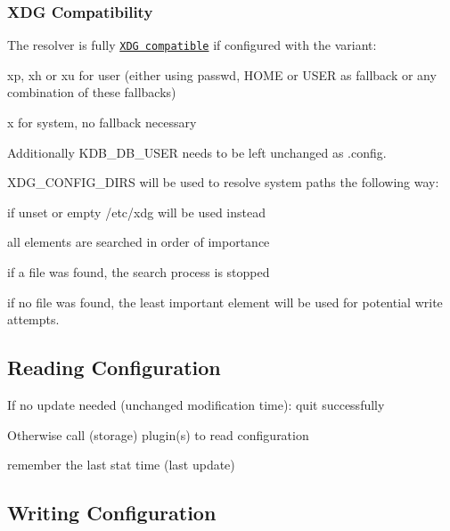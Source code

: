 \subsubsection*{X\+D\+G Compatibility}

The resolver is fully \href{http://standards.freedesktop.org/basedir-spec/basedir-spec-latest.html}{\tt X\+D\+G compatible} if configured with the variant\+:


\begin{DoxyItemize}
\item xp, xh or xu for user (either using passwd, H\+O\+M\+E or U\+S\+E\+R as fallback or any combination of these fallbacks)
\item x for system, no fallback necessary
\end{DoxyItemize}

Additionally {\ttfamily K\+D\+B\+\_\+\+D\+B\+\_\+\+U\+S\+E\+R} needs to be left unchanged as {\ttfamily .config}.

{\ttfamily X\+D\+G\+\_\+\+C\+O\+N\+F\+I\+G\+\_\+\+D\+I\+R\+S} will be used to resolve system paths the following way\+:


\begin{DoxyItemize}
\item if unset or empty {\ttfamily /etc/xdg} will be used instead
\item all elements are searched in order of importance
\begin{DoxyItemize}
\item if a file was found, the search process is stopped
\item if no file was found, the least important element will be used for potential write attempts.
\end{DoxyItemize}
\end{DoxyItemize}

\subsection*{Reading Configuration}


\begin{DoxyEnumerate}
\item If no update needed (unchanged modification time)\+: quit successfully
\item Otherwise call (storage) plugin(s) to read configuration
\item remember the last stat time (last update)
\end{DoxyEnumerate}

\subsection*{Writing Configuration}

